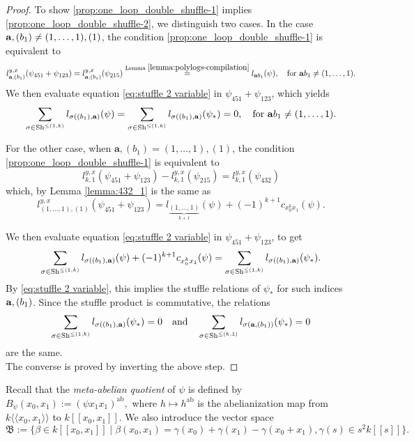 \documentclass[a4paper,fleqn]{cas-sc}
\begin{document}
\begin{proof}
To show \eqref{prop:one_loop_double_shuffle-1} implies \eqref{prop:one_loop_double_shuffle-2}, we distinguish two cases. In the case ${\bf{a}},(b_1)\ne (1,\dots,1),(1)$, the condition \eqref{prop:one_loop_double_shuffle-1} is equivalent to %
$$
		l^{y,x}_{{\bf{a}},(b_1)}(\psi_{451}+\psi_{123})=l^{y,x}_{{\bf{a}},(b_1)}(\psi_{215})\overset{ \text{Lemma } \ref{lemma:polylogs-compilation}}{=}l_{{\bf{a}}b_1}(\psi),\quad \text{for }{{\bf{a}}b_1}\ne (1,\dots,1).
$$
We then evaluate equation \eqref{eq:stuffle 2 variable} in $\psi_{451}+\psi_{123}$, which yields
$$
\sum_{\sigma\in \text{Sh}^{\le (1,k)}}l_{\sigma\left((b_1),{\bf{a}}\right)}(\psi)=\sum_{\sigma\in \text{Sh}^{\le (1,k)}}l_{\sigma\left((b_1),{\bf{a}}\right)}(\psi_{*})=0, \quad \text{for }{{\bf{a}}b_1}\ne (1,\dots,1).
$$

For the other case, when $\textbf{a},(b_1)=(1, \ldots, 1), (1)$, the condition \eqref{prop:one_loop_double_shuffle-1} is equivalent to
$$
l^{y,x}_{k,1}(\psi_{451}+\psi_{123})-l^{y,x}_{k,1}(\psi_{215})=l^{y,x}_{k,1}(\psi_{432})
$$
which, by Lemma \ref{lemma:432_1} is the same as
$$
l^{y,x}_{(1,\dots,1),(1)}(\psi_{451}+\psi_{123}) =l_{\underbrace{(1,\dots,1)}_{k+1}}(\psi)+(-1)^{k+1}c_{x_0^{k}x_1}(\psi).
$$

We then evaluate equation \eqref{eq:stuffle 2 variable} in $\psi_{451}+\psi_{123}$, to get
$$
\sum_{\sigma\in \text{Sh}^{\le (1,k)}}l_{\sigma\left((b_1),{\bf{a}}\right)}(\psi)+(-1)^{k+1}c_{x^k_0x_1}(\psi)=\sum_{\sigma\in \text{Sh}^{\le (1,k)}}l_{\sigma\left((b_1),{\bf{a}}\right)}(\psi_{*}).
$$
By \eqref{eq:stuffle 2 variable}, this implies the stuffle relations of $\psi_{*}$ for such indices ${\bf{a}},(b_1)$. Since the stuffle product is commutative, the relations
$$
    \sum_{\sigma\in \text{Sh}^{\le (1,k)}}l_{\sigma\left((b_1),{\bf{a}}\right)}(\psi_{*})=0 \quad \text{and} \quad \sum_{\sigma\in \text{Sh}^{\le (k,1)}}l_{\sigma\left({\bf{a}},(b_1)\right)}(\psi_{*})=0
$$
are the same. \\

The converse is proved by inverting the above step.
\end{proof}

Recall that
the \textit{meta-abelian quotient} of $\psi$ is defined by
$
	B_{\psi}(x_0,x_1):=\left(\psi{x_1}x_1\right)^{\text{ab}},
$
where $h \mapsto h^{\text{ab}}$ is the abelianization map from $k\langle\langle x_0,x_1\rangle\rangle$ to $k[[x_0,x_1]]$. We also introduce the vector space
$$
	\mathfrak{B}:=\{\beta\in k[[x_0,x_1]] \mid \beta(x_0,x_1)=\gamma(x_0)+\gamma(x_1)-\gamma(x_0+x_1),\gamma(s)\in s^2k[[s]]\}.
$$
\end{document}
